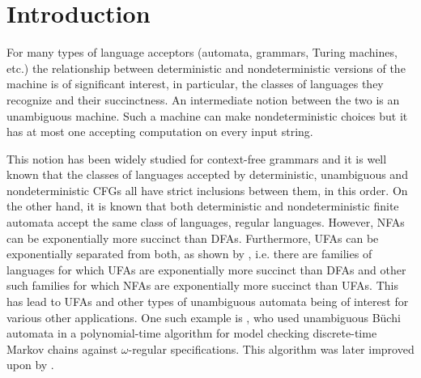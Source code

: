 \documentclass{report}
\theoremstyle{definition}
\begin{document}

\tableofcontents
\listoffigures

\clearpage
{}

\chapter{Introduction}

For many types of language acceptors (automata, grammars, Turing machines, etc.) the
relationship between deterministic and nondeterministic versions of the machine
is of significant interest, in particular, the classes of languages they recognize
and their succinctness. An intermediate notion between the two is an unambiguous
machine. Such a machine can make nondeterministic choices but it has at most one
accepting computation on every input string.

This notion has been widely studied for context-free grammars and it is well
known that the classes of languages accepted by deterministic, unambiguous and
nondeterministic CFGs all have strict inclusions between them, in this order.
On the other hand, it is known that both deterministic and nondeterministic finite
automata accept the same class of languages, regular languages. However, NFAs can be
exponentially more succinct than DFAs. Furthermore, UFAs can be exponentially
separated from both, as shown by \cite{UFA_exp_sep}, i.e. there are families
of languages for which UFAs are exponentially more succinct than DFAs and other
such families for which NFAs are exponentially more succinct than UFAs.
This has lead to UFAs and other types of unambiguous automata being of interest
for various other applications. One such example is \cite{UBA_markov}, who used
unambiguous B\"uchi automata in a polynomial-time algorithm for model checking
discrete-time Markov chains against $\omega$-regular specifications. This algorithm
was later improved upon by \cite{UBA_markov_improv}.
\end{document}
